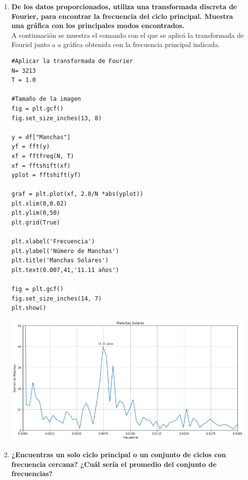 \documentclass[11pt]{article}
\begin{document}
\begin{enumerate}
\item \textbf{De los datos proporcionados, utiliza una transformada discreta de Fourier, para encontrar la frecuencia del ciclo principal. Muestra una gráfica con los principales modos encontrados.}\\

A continuación se muestra el comando con el que se aplicó la transformada de Fouriel junto a a gráfica obtenida con la frecuencia principal indicada. 

\begin{verbatim}
#Aplicar la transformada de Fourier
N= 3213
T = 1.0

#Tamaño de la imagen
fig = plt.gcf()
fig.set_size_inches(13, 8)

y = df["Manchas"] 
yf = fft(y)
xf = fftfreq(N, T)
xf = fftshift(xf)
yplot = fftshift(yf)

graf = plt.plot(xf, 2.0/N *abs(yplot))
plt.xlim(0,0.02)
plt.ylim(0,50)
plt.grid(True)

plt.xlabel('Frecuencia')
plt.ylabel('Número de Manchas')
plt.title('Manchas Solares')
plt.text(0.007,41,'11.11 años')

fig = plt.gcf()
fig.set_size_inches(14, 7)
plt.show()
\end{verbatim}

\begin{center}
\includegraphics[scale=0.50]{grafi.png}
\end{center}

\vspace{1cm}

\item\textbf{¿Encuentras un solo ciclo principal o un conjunto de ciclos con frecuencia cercana? ¿Cuál sería el promedio del conjunto de frecuencias?}\\


\end{enumerate}
\end{document}
